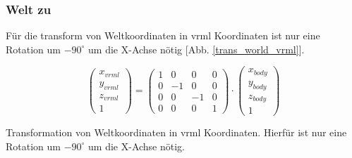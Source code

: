 \subsubsection{Welt zu }
Für die \gls{transform} von Weltkoordinaten in \gls{vrml} Koordinaten ist nur eine Rotation um $-90^\circ$ um die X-Achse nötig [Abb. \ref{trans_world_vrml}].
\begin{ownequation}[H]
\begin{equation}
\begin{pmatrix}
x_{vrml}\\y_{vrml}\\z_{vrml}\\1
\end{pmatrix}
=
\begin{pmatrix}
1 & 0 & 0& 0\\
0 & -1 & 0& 0\\
0 & 0 & -1& 0\\
0 & 0 & 0 & 1
\end{pmatrix}
\cdot
\begin{pmatrix}
x_{body}\\y_{body}\\z_{body}\\1
\end{pmatrix}
\end{equation}
\caption[\gls{transform} von Weltkoordinaten in  Koordinaten]{Transformation von Weltkoordinaten in \gls{vrml} Koordinaten. Hierfür ist nur eine Rotation um $-90^\circ$ um die X-Achse nötig.}
\label{trans_world_vrml}
\end{ownequation}
\newpage